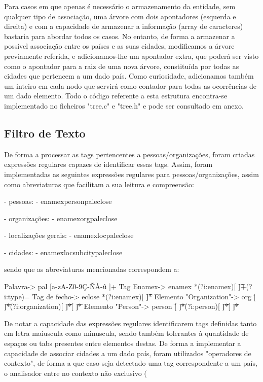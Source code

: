 Para casos em que apenas é necessário o armazenamento da entidade, sem qualquer tipo de associação, uma árvore com dois apontadores (esquerda e direita) e com a capacidade de armazenar a informação (array de caracteres) bastaria para abordar todos os casos. No entanto, de forma a armazenar a possível associação entre os países e as suas cidades, modificamos a árvore previamente referida, e adicionamos-lhe um apontador extra, que poderá ser visto como o apontador para a raiz de uma nova árvore, constituída por todas as cidades que pertencem a um dado país. Como curiosidade, adicionamos também um inteiro em cada nodo que servirá como contador para todas as ocorrências de um dado elemento. Todo o código referente a esta estrutura encontra-se implementado no ficheiros "tree.c" e "tree.h" e pode ser consultado em anexo.

\subsection{Filtro de Texto}
\label{seq:enamex-filtro}

De forma a processar as tags pertencentes a pessoas/organizações, foram criadas expressões regulares capazes de identificar essas tags.
Assim, foram implementadas as seguintes expressões regulares para pessoas/organizações, assim como abreviaturas que facilitam a sua leitura e compreensão:

- pessoas: 
	- {enamex}{person}{pal}{eclose} 

- organizações:
	- {enamex}{org}{pal}{eclose}

- localizações gerais:
	- {enamex}{loc}{pal}{eclose} 

- cidades:
	- {enamex}{loc}{subcity}{pal}{eclose}   


sendo que as abreviaturas mencionadas correspondem a:

Palavra-> 					pal         [a-zA-Z0-9Ç-ÑÀ-û ]+
Tag Enamex-> 				enamex      \<[ \t]*(?i:enamex)[ \t]+(?i:type)=
Tag de fecho->				eclose      \<[ \t]*\/(?i:enamex)[ \t]*\>
Elemento "Organization"->	org         \"[ \t]*(?i:organization)[ \t]*\"[ \t]*\>
Elemento "Person"->			person      \"[ \t]*(?i:person)[ \t]*\"[ \t]*\>

De notar a capacidade das expressões regulares identificarem tags definidas tanto em letra maiuscula como minuscula, sendo também tolerantes à quantidade de espaços ou tabs presentes entre elementos destas.
De forma a implementar a capacidade de associar cidades a um dado país, foram utilizados "operadores de contexto", de forma a que caso seja detectado uma tag correspondente a um país, o analisador entre no contexto não exclusivo (%

